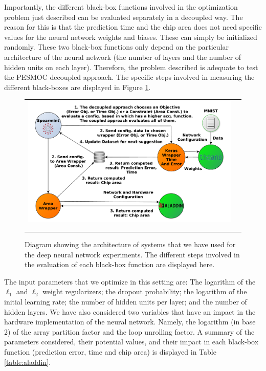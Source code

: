 Importantly, the different black-box functions involved in the optimization problem just described can be
evaluated separately in a decoupled way. The reason for this is that the prediction time and the chip
area does not need specific values for the neural network weights and biases. These can simply be
initialized randomly. These two black-box functions only depend on the particular architecture of the
neural network (the number of layers and the number of hidden units on each layer). Therefore, the problem described
is adequate to test the PESMOC decoupled approach. The specific steps involved in measuring the different black-boxes are
displayed in Figure \ref{fig:arch_alad}.

\begin{figure}[htb]
\begin{center}
        \begin{tabular}{cc}
                \vspace{-.2cm}
                \includegraphics[width=0.99\linewidth]{Figures/pesmoc/real/diagrams/architecture_real_hard_exp.pdf} \\ \\
                \vspace{-.1cm}
        \end{tabular}
        \caption{Diagram showing the architecture of systems that we have used for the deep neural network experiments.
                The different steps involved in the evaluation of each black-box function are displayed here.}
        \label{fig:arch_alad}
\end{center}
\end{figure}

The input parameters that we optimize in this setting are:
The logarithm of the $\ell_1$  and $\ell_2$ weight regularizers;
the dropout probability; the logarithm of the initial learning
rate; the number of hidden units per layer; and the number of hidden layers. We have also
considered two variables that have an impact in the hardware implementation
of the neural network. Namely, the logarithm (in base 2) of the array partition factor
and the loop unrolling factor. A summary of the parameters considered, their potential values, and their impact in each
black-box function (prediction error, time and chip area) is displayed in Table \ref{table:aladdin}.

